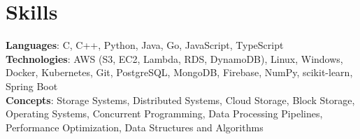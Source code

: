\documentclass[letterpaper,11pt]{article}
\begin{document}
\section{Skills}
 \begin{itemize}[leftmargin=0.15in, label={}]
    \small{\item{
     \textbf{Languages}{: C, C++, Python, Java, Go, JavaScript, TypeScript} \\
     \textbf{Technologies}{: AWS (S3, EC2, Lambda, RDS, DynamoDB), Linux, Windows, Docker, Kubernetes, Git, PostgreSQL, MongoDB, Firebase, NumPy, scikit-learn, Spring Boot} \\
     \textbf{Concepts}{: Storage Systems, Distributed Systems, Cloud Storage, Block Storage, Operating Systems, Concurrent Programming, Data Processing Pipelines, Performance Optimization, Data Structures and Algorithms} }}
 \end{itemize}
 
%
\end{document}
